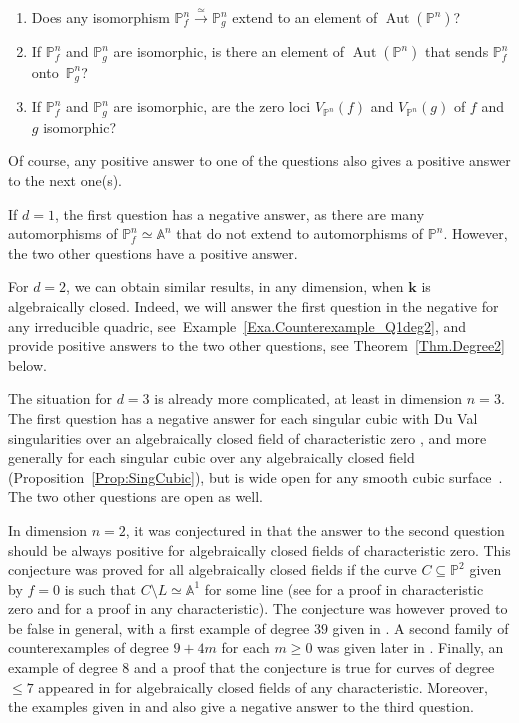 \documentclass[JEP,XML,SOM,Unicode,NoFloatCountersInSection,published]{cedram}
\theoremstyle{definition}
\newcommand\iso{\stackrel{\simeq}{\longrightarrow}}
\newcommand\A{{\mathbb A}}\let\AA\A
\renewcommand\k{{\mathbf k}}
\newcommand\p{{\mathbb P}}\let\PP\p
\DeclareMathOperator{\Aut}{Aut}
\begin{document}
\begin{enumerate}
\item \label{Quest1}
Does any isomorphism $\p^n_{f}\iso \p^n_{g}$ extend to an element of $\Aut(\p^n)$?
\item \label{Quest2}
If $\p^n_{f}$ and $\p^n_{g}$ are isomorphic, is there an element of $\Aut(\p^n)$ that sends $\p^n_{f}$ onto~$\p^n_{g}$?
\item \label{Quest3}
If $\p^n_{f}$ and $\p^n_{g}$ are isomorphic, are the zero loci $V_{\p^n}(f)$ and $V_{\p^n}(g)$ of $f$ and $g$ isomorphic?
\end{enumerate}
Of course, any positive answer to one of the questions also gives a positive answer to the next one(s).

If $d=1$, the first question has a negative answer, as there are many automorphisms of $\p^n_f\simeq \A^n$ that do not extend
to automorphisms of $\p^n$. However, the two other questions have a positive answer.

For $d=2$, we can obtain similar results, in any dimension, when $\k$ is algebraically closed. Indeed, we will answer the first question in the negative for any irreducible quadric, see~Example~\ref{Exa.Counterexample_Q1deg2},
and provide positive answers to the two other questions, see Theorem~\ref{Thm.Degree2} below.

The situation for $d=3$ is already more complicated, at least in dimension $n=3$.
The first question has a negative answer for each singular cubic with Du Val singularities
over an algebraically closed field of characteristic zero \cite[Th.\,C \& Th.\,4.3]{CheDub}, and
more generally for each singular cubic
over any algebraically closed field (Proposition~\ref{Prop:SingCubic}),
but is wide open for any smooth cubic surface~\cite[p.\,6]{2005Affine-algebraic-g}.
The two other questions are open as well.

In dimension $n=2$, it was conjectured in \cite{Yoshihara} that the answer to the second question should be always positive
for algebraically closed fields of characteristic zero. This conjecture was proved for all algebraically closed fields if the curve $C\subseteq \p^2$ given by $f=0$ is such that $C\setminus L\simeq \A^1$ for some line (see \cite[Th.]{Yoshihara} for a proof
in characteristic zero and \cite[Th.\,1]{Hemmig} for a proof in any characteristic). The conjecture was however proved to be false in general, with a first example of degree $39$ {given in} \cite{BlancC}. A second family of counterexamples
of degree $9+4m$ for each $m\ge 0$ was given {later} in \cite{Costa}. Finally, an example of degree $8$ and a proof that the conjecture is true for curves of degree $\le 7$ appeared in
\cite[Cor.\,1.2, Th.\,3]{Hemmig} for algebraically closed fields of any characteristic. Moreover, the examples given in \cite{Hemmig} and \cite{BlancC} also give a negative answer to the third question.
\end{document}
